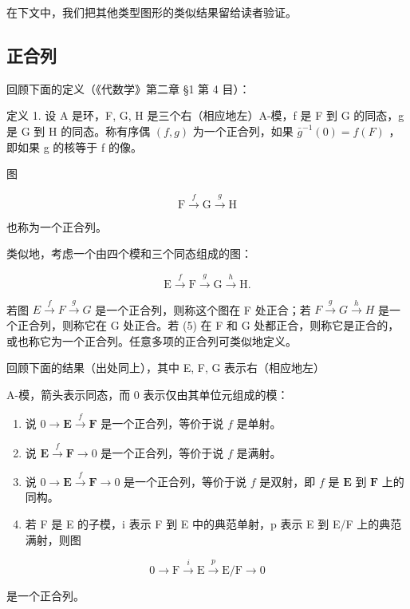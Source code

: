 在下文中，我们把其他类型图形的类似结果留给读者验证。

\subsection{正合列}

回顾下面的定义（《代数学》第二章 §1 第 4 目）：

定义 1. 设 A 是环，F, G, H 是三个右（相应地左）A-模，f 是 F 到 G 的同态，g 是 G 到 H 的同态。称有序偶 \((f, g)\) 为一个正合列，如果 \(\bar{g}^{-1}(0) = f(F)\) ，即如果 g 的核等于 f 的像。

图

\[
\mathrm{F} \xrightarrow {f} \mathrm{G} \xrightarrow {g} \mathrm{H}\tag{4}
\]

也称为一个正合列。

类似地，考虑一个由四个模和三个同态组成的图：

\[
\mathrm{E} \xrightarrow {f} \mathrm{F} \xrightarrow {g} \mathrm{G} \xrightarrow {h} \mathrm{H}.\tag{5}
\]

若图 \(E \xrightarrow{f} F \xrightarrow{g} G\) 是一个正合列，则称这个图在 F 处正合；若 \(F \xrightarrow{g} G \xrightarrow{h} H\) 是一个正合列，则称它在 G 处正合。若 (5) 在 F 和 G 处都正合，则称它是正合的，或也称它为一个正合列。任意多项的正合列可类似地定义。

回顾下面的结果（出处同上），其中 E, F, G 表示右（相应地左）

A-模，箭头表示同态，而 0 表示仅由其单位元组成的模：

\begin{enumerate}
\def\labelenumi{(\alph{enumi})}
\item
  说 \(0 \to \mathbf{E} \xrightarrow{f} \mathbf{F}\) 是一个正合列，等价于说 \(f\) 是单射。
\item
  说 \(\mathbf{E} \xrightarrow{f} \mathbf{F} \to 0\) 是一个正合列，等价于说 \(f\) 是满射。
\item
  说 \(0 \to \mathbf{E} \xrightarrow{f} \mathbf{F} \to 0\) 是一个正合列，等价于说 \(f\) 是双射，即 \(f\) 是 \(\mathbf{E}\) 到 \(\mathbf{F}\) 上的同构。
\item
  若 F 是 E 的子模，i 表示 F 到 E 中的典范单射，p 表示 E 到 E/F 上的典范满射，则图
\end{enumerate}

\[
0 \longrightarrow \mathrm{F} \stackrel {i} {\longrightarrow} \mathrm{E} \stackrel {p} {\longrightarrow} \mathrm{E} / \mathrm{F} \longrightarrow 0\tag{6}
\]

是一个正合列。

